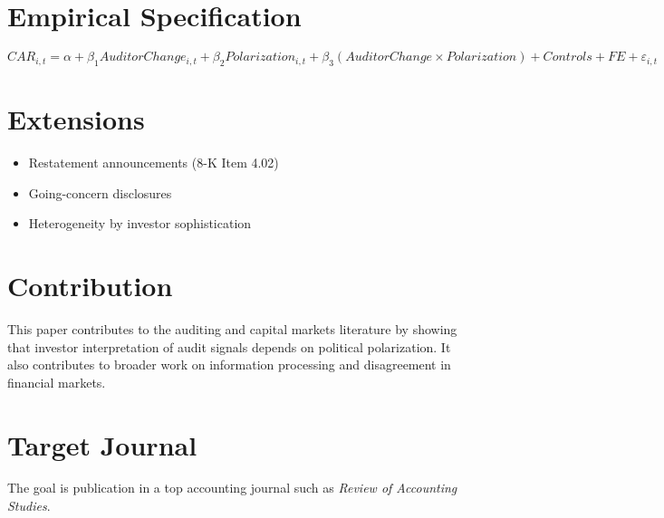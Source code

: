 \documentclass[12pt]{article}
\begin{document}
\section{Empirical Specification}

\begin{equation}
CAR_{i,t} = \alpha + \beta_1 AuditorChange_{i,t} + \beta_2 Polarization_{i,t} + \beta_3 (AuditorChange \times Polarization) + Controls + FE + \varepsilon_{i,t}
\end{equation}

\section{Extensions}

\begin{itemize}
\item Restatement announcements (8-K Item 4.02)
\item Going-concern disclosures
\item Heterogeneity by investor sophistication
\end{itemize}

\section{Contribution}

This paper contributes to the auditing and capital markets literature by showing that investor interpretation of audit signals depends on political polarization. It also contributes to broader work on information processing and disagreement in financial markets.

\section{Target Journal}

The goal is publication in a top accounting journal such as \textit{Review of Accounting Studies}.
\end{document}
